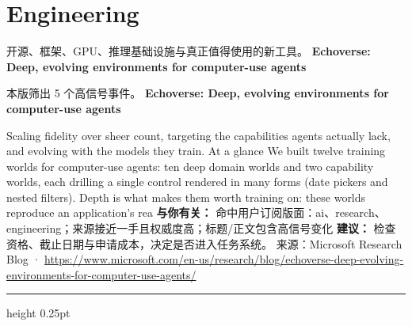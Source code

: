 \documentclass[10.5pt]{ctexart}
\begin{document}
\section*{Engineering}
{\color{ormuted} 开源、框架、GPU、推理基础设施与真正值得使用的新工具。}
\vspace{2mm}
{\LARGE\bfseries Echoverse: Deep, evolving environments for computer-use agents}\par
\vspace{1mm}
{\color{ormuted} 本版筛出 5 个高信号事件。}
\vspace{3mm}
{\Large\bfseries Echoverse: Deep, evolving environments for computer-use agents}\par
Scaling fidelity over sheer count, targeting the capabilities agents actually lack, and evolving with the models they train. At a glance We built twelve training worlds for computer-use agents: ten deep domain worlds and two capability worlds, each drilling a single control rendered in many forms (date pickers and nested filters). Depth is what makes them worth training on: these worlds reproduce an application’s rea
\textbf{与你有关：} 命中用户订阅版面：ai、research、engineering；来源接近一手且权威度高；标题/正文包含高信号变化
\textbf{建议：} 检查资格、截止日期与申请成本，决定是否进入任务系统。
{\footnotesize\color{ormuted} 来源：Microsoft Research Blog · \url{https://www.microsoft.com/en-us/research/blog/echoverse-deep-evolving-environments-for-computer-use-agents/}}
\vspace{4mm}
\hrule height 0.25pt
\vspace{3mm}
\end{document}
